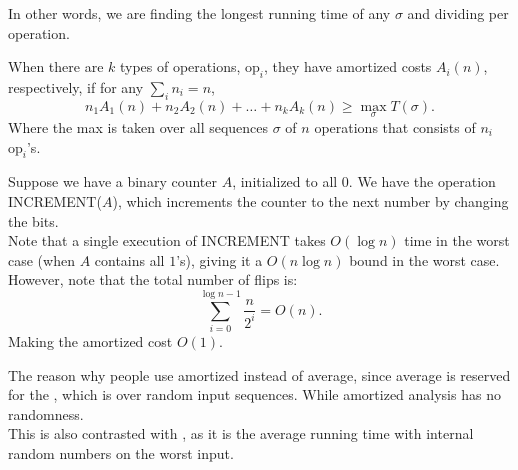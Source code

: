 \documentclass[../main/main.tex]{subfiles}
\begin{document}
\begin{remark}
	In other words, we are finding the longest running time of any $\sigma$ and dividing per operation.
\end{remark}
\begin{definition}
	When there are $k$ types of operations, $\text{op}_{i}$, they have amortized costs $A_i(n)$, respectively, if for any  $\sum_{i} n_i=n$,\[
		n_1A_1(n)+n_2A_2(n)+\ldots+n_kA_k(n)\ge \max_\sigma T(\sigma)
	.\] Where the max is taken over all sequences $\sigma$ of $n$ operations that consists of $n_i$ $\text{op}_i$'s.
\end{definition}
\begin{example}
	Suppose we have a binary counter $A$, initialized to all $0$. We have the operation INCREMENT($A$), which increments the counter to the next number by changing the bits.\\

	Note that a single execution of INCREMENT takes  $O(\log n)$ time in the worst case (when $A$ contains all $1$'s), giving it a $O(n\log n)$ bound in the worst case. However, note that the total number of flips is: \[
		\sum_{i=0}^{\log n-1} \frac{n}{2^{i}}=O(n)
	.\] Making the amortized cost $O(1)$.

\end{example}
\begin{remark}
	The reason why people use amortized instead of average, since average is reserved for the , which is over random input sequences. While amortized analysis has no randomness.\\

	This is also contrasted with , as it is the average running time with internal random numbers on the worst input.
\end{remark}
\end{document}
